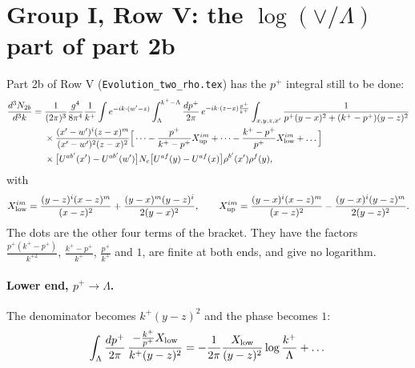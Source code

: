 \documentclass[10pt]{article}
\numberwithin{equation}{section}
\begin{document}
\section{Group I, Row V: the \texorpdfstring{$\log(\vee/\Lambda)$}{log} part of part 2b}\label{T:sec:rowV}
Part 2b of Row V (\texttt{Evolution\_two\_rho.tex}) has the $p^+$ integral still to be done:
\begin{align}
\frac{d^3N_{2b}}{d^3k}={}&\frac{1}{(2\pi)^3}\frac{g^4}{8\pi^4}\frac1{k^+}\int e^{-ik\cdot(w'-z)}\int_\Lambda^{k^+-\Lambda}\frac{dp^+}{2\pi}\,e^{-ik\cdot(z-x)\frac{p^+}{k^+}}\int_{x,y,z,x'}\frac{1}{p^+(y-x)^2+(k^+-p^+)(y-z)^2}\notag\\
&\times\frac{(x'-w')^i(z-x)^m}{(x'-w')^2(z-x)^2}\Big[\dots-\frac{p^+}{k^+-p^+}X^{im}_{\rm up}+\dots-\frac{k^+-p^+}{p^+}X^{im}_{\rm low}+\dots\Big]\notag\\
&\times\big[U^{ab'}(x')-U^{ab'}(w')\big]N_c\big[U^{af}(y)-U^{af}(x)\big]\rho^{b'}(x')\rho^f(y),
\end{align}
with
\begin{equation}
X^{im}_{\rm low}=\frac{(y-z)^i(x-z)^m}{(x-z)^2}+\frac{(y-x)^m(y-z)^i}{2(y-x)^2},\qquad X^{im}_{\rm up}=\frac{(y-x)^i(x-z)^m}{(x-z)^2}-\frac{(y-x)^i(y-z)^m}{2(y-z)^2}.
\end{equation}
The dots are the other four terms of the bracket. They have the factors $\frac{p^+(k^+-p^+)}{k^{+2}}$, $\frac{k^+-p^+}{k^+}$, $\frac{p^+}{k^+}$ and $1$, are finite at both ends, and give no logarithm.

\paragraph{Lower end, $p^+\to\Lambda$.} The denominator becomes $k^+(y-z)^2$ and the phase becomes $1$:
\begin{equation}
\int_\Lambda\frac{dp^+}{2\pi}\,\frac{-\frac{k^+}{p^+}X_{\rm low}}{k^+(y-z)^2}=-\frac{1}{2\pi}\frac{X_{\rm low}}{(y-z)^2}\log\frac{k^+}{\Lambda}+\dots
\end{equation}
\end{document}
